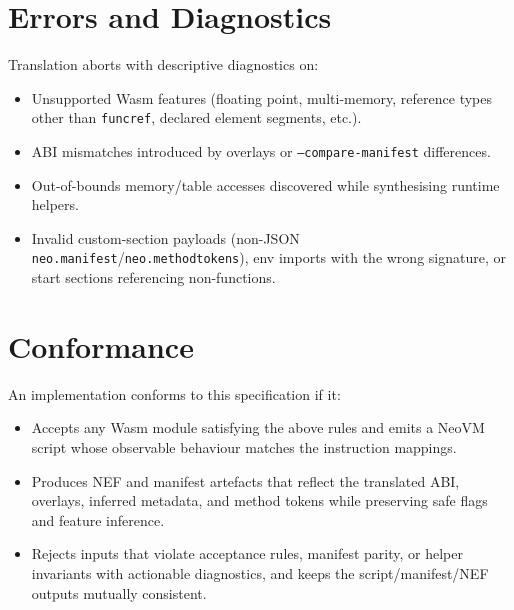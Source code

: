 \documentclass[11pt]{article}
\begin{document}
\section{Errors and Diagnostics}
Translation aborts with descriptive diagnostics on:
\begin{itemize}[nosep]
    \item Unsupported Wasm features (floating point, multi-memory, reference types other than \texttt{funcref}, declared element segments, etc.).
    \item ABI mismatches introduced by overlays or \texttt{--compare-manifest} differences.
    \item Out-of-bounds memory/table accesses discovered while synthesising runtime helpers.
    \item Invalid custom-section payloads (non-JSON \texttt{neo.manifest}/\texttt{neo.methodtokens}), env imports with the wrong signature, or start sections referencing non-functions.
\end{itemize}

\section{Conformance}
An implementation conforms to this specification if it:
\begin{itemize}[nosep]
    \item Accepts any Wasm module satisfying the above rules and emits a NeoVM script whose observable behaviour matches the instruction mappings.
    \item Produces NEF and manifest artefacts that reflect the translated ABI, overlays, inferred metadata, and method tokens while preserving safe flags and feature inference.
    \item Rejects inputs that violate acceptance rules, manifest parity, or helper invariants with actionable diagnostics, and keeps the script/manifest/NEF outputs mutually consistent.
\end{itemize}
\end{document}
